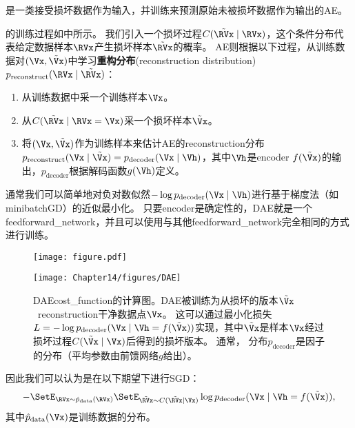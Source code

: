 \section{}
\label{sec:denoising_autoencoders}
是一类接受损坏数据作为输入，并训练来预测原始未被损坏数据作为输出的\gls{AE}。


的训练过程如中所示。
我们引入一个损坏过程$C(\tilde{\RVx} \mid \RVx)$，这个条件分布代表给定数据样本$\RVx$产生损坏样本$\tilde \RVx$的概率。
\gls{AE}则根据以下过程，从训练数据对$(\Vx, \tilde \Vx)$中学习\textbf{重构分布}(reconstruction distribution)~$p_{\text{reconstruct}} (\RVx \mid \tilde \RVx)$：
\begin{enumerate}
\item 从训练数据中采一个训练样本$\Vx$。
\item 从$C(\tilde{\RVx} \mid \RVx=\Vx)$采一个损坏样本$\tilde \Vx$。
\item 将$(\Vx, \tilde \Vx)$作为训练样本来估计\gls{AE}的\gls{reconstruction}分布 
$p_{\text{reconstruct}} (\Vx \mid \tilde \Vx) = p_{\text{decoder}}(\Vx \mid\Vh)$，其中$\Vh$是\gls{encoder} $f(\tilde \Vx)$的输出，$p_{\text{decoder}}$根据解码函数$g(\Vh)$定义。
\end{enumerate}
通常我们可以简单地对负对数似然$-\log p_{\text{decoder}} (\Vx \mid \Vh)$进行基于梯度法（如\gls{minibatch}\gls{GD}）的近似最小化。
只要\gls{encoder}是确定性的，\gls{DAE}就是一个\gls{feedforward_network}，并且可以使用与其他\gls{feedforward_network}完全相同的方式进行训练。

\begin{figure}[!htb]
\ifOpenSource
\centerline{\texttt{[image: figure.pdf]}}
\else
\centerline{\texttt{[image: Chapter14/figures/DAE]}}
\fi
\caption{\gls{DAE}\gls{cost_function}的计算图。\gls{DAE}被训练为从损坏的版本$\tilde \Vx$~\gls{reconstruction}干净数据点$\Vx$。
这可以通过最小化损失$L = - \log p_{\text{decoder}} (\Vx \mid \Vh = f(\tilde \Vx))$实现，其中$\tilde \Vx$是样本$\Vx$经过损坏过程$C (\tilde \Vx \mid \Vx)$后得到的损坏版本。
通常， 分布$p_{\text{decoder}}$是因子的分布（平均参数由前馈网络$g$给出）。
}
\label{fig:chap14_DAE}
\end{figure}

因此我们可以认为是在以下期望下进行\gls{SGD}：
\begin{align}
   - \SetE_{\RVx \sim \hat{p}_{\text{data}}(\RVx)} \SetE_{\tilde{\RVx} \sim C(\tilde{\RVx}\mid\Vx)} \log p_{\text{decoder}}(\Vx \mid \Vh = f(\tilde{\Vx})),
\end{align}
其中$\hat{p}_{\text{data}}(\Vx)$是训练数据的分布。

